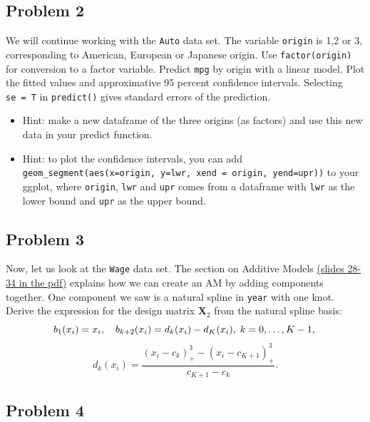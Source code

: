\documentclass[]{article}
\begin{document}
\hypertarget{problem-2}{%
\subsection{Problem 2}\label{problem-2}}

We will continue working with the \texttt{Auto} data set. The variable
\texttt{origin} is 1,2 or 3, corresponding to American, European or
Japanese origin. Use \texttt{factor(origin)} for conversion to a factor
variable. Predict \texttt{mpg} by origin with a linear model. Plot the
fitted values and approximative 95 percent confidence intervals.
Selecting \texttt{se\ =\ T} in \texttt{predict()} gives standard errors
of the prediction.

\begin{itemize}
\item
  Hint: make a new dataframe of the three origins (as factors) and use
  this new data in your predict function.
\item
  Hint: to plot the confidence intervals, you can add
  \texttt{geom\_segment(aes(x=origin,\ y=lwr,\ xend\ =\ origin,\ yend=upr))}
  to your ggplot, where \texttt{origin}, \texttt{lwr} and \texttt{upr}
  comes from a dataframe with \texttt{lwr} as the lower bound and
  \texttt{upr} as the upper bound.
\end{itemize}

\hypertarget{problem-3}{%
\subsection{Problem 3}\label{problem-3}}

Now, let us look at the \texttt{Wage} data set. The section on Additive
Models
\href{https://github.com/stefaniemuff/statlearning/blob/master/7BeyondLinear/7slides.pdf}{(slides
28-34 in the pdf)} explains how we can create an AM by adding components
together. One component we saw is a natural spline in \texttt{year} with
one knot. Derive the expression for the design matrix \(\mathbf X_2\)
from the natural spline basis: \[
b_1(x_i) = x_i, \quad b_{k+2}(x_i) = d_k(x_i)-d_K(x_i),\; k = 0, \ldots, K - 1,\\
\] \[
d_k(x_i) = \frac{(x_i-c_k)^3_+-(x_i-c_{K+1})^3_+}{c_{K+1}-c_k}.
\]

\hypertarget{problem-4}{%
\subsection{Problem 4}\label{problem-4}}
\end{document}
